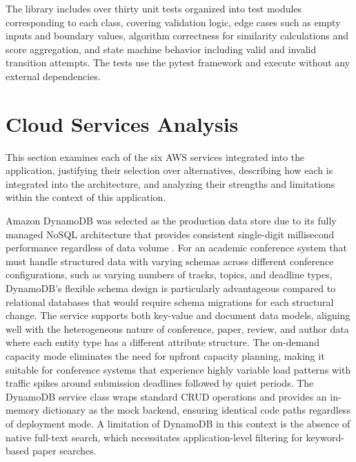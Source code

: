 \documentclass[conference]{IEEEtran}
\begin{document}
The library includes over thirty unit tests organized into test modules corresponding to each class, covering validation logic, edge cases such as empty inputs and boundary values, algorithm correctness for similarity calculations and score aggregation, and state machine behavior including valid and invalid transition attempts. The tests use the pytest framework and execute without any external dependencies.

\section{Cloud Services Analysis}

This section examines each of the six AWS services integrated into the application, justifying their selection over alternatives, describing how each is integrated into the architecture, and analyzing their strengths and limitations within the context of this application.

Amazon DynamoDB was selected as the production data store due to its fully managed NoSQL architecture that provides consistent single-digit millisecond performance regardless of data volume \cite{dynamodb2024}. For an academic conference system that must handle structured data with varying schemas across different conference configurations, such as varying numbers of tracks, topics, and deadline types, DynamoDB's flexible schema design is particularly advantageous compared to relational databases that would require schema migrations for each structural change. The service supports both key-value and document data models, aligning well with the heterogeneous nature of conference, paper, review, and author data where each entity type has a different attribute structure. The on-demand capacity mode eliminates the need for upfront capacity planning, making it suitable for conference systems that experience highly variable load patterns with traffic spikes around submission deadlines followed by quiet periods. The DynamoDB service class wraps standard CRUD operations and provides an in-memory dictionary as the mock backend, ensuring identical code paths regardless of deployment mode. A limitation of DynamoDB in this context is the absence of native full-text search, which necessitates application-level filtering for keyword-based paper searches.
\end{document}
